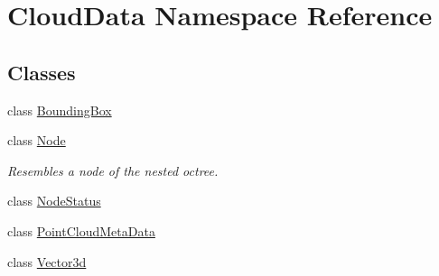\hypertarget{namespace_cloud_data}{}\section{Cloud\+Data Namespace Reference}
\label{namespace_cloud_data}
\subsection*{Classes}
\begin{DoxyCompactItemize}
\item 
class \hyperlink{class_cloud_data_1_1_bounding_box}{Bounding\+Box}
\item 
class \hyperlink{class_cloud_data_1_1_node}{Node}
\begin{DoxyCompactList}\small\item\em Resembles a node of the nested octree. \end{DoxyCompactList}\item 
class \hyperlink{class_cloud_data_1_1_node_status}{Node\+Status}
\item 
class \hyperlink{class_cloud_data_1_1_point_cloud_meta_data}{Point\+Cloud\+Meta\+Data}
\item 
class \hyperlink{class_cloud_data_1_1_vector3d}{Vector3d}
\end{DoxyCompactItemize}
